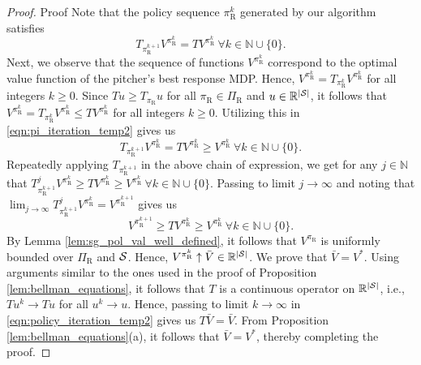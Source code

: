 \documentclass[opre,dblanonrev]{informs4}
\newcommand{\abs}[1]{\left\lvert#1\right\rvert}
\begin{document}
\begin{APPENDICES}
\begin{proof}{Proof}
           Note that the policy sequence $\pi_\text{R}^k$ generated by our algorithm satisfies  
           \begingroup
           \allowdisplaybreaks
           \begin{equation}
           \label{eqn:pi_iteration_temp2}
           T_{\pi_\text{R}^{k+1}}V^{\pi_\text{R}^k} = TV^{\pi_\text{R}^k} \ \forall k \in \mathbb{N} \cup \{0\}.
           \end{equation}
           \endgroup
           Next, we observe that the sequence of functions $V^{\pi_\text{R}^k}$ correspond to the optimal value function of the pitcher's best response MDP. Hence, $V^{\pi_\text{R}^k} = T_{\pi_\text{R}^k} V^{\pi_\text{R}^k}$ for all integers $k \geq 0$. Since $Tu \geq T_{\pi_\text{R}}u$ for all $\pi_\text{R} \in \Pi_\text{R}$ and $u \in \mathbb{R}^{\abs{\cal S}}$, it follows that $V^{\pi_\text{R}^k} = T_{\pi_\text{R}^k} V^{\pi_\text{R}^k} \leq T V^{\pi_\text{R}^k}$ for all integers $k \geq 0$. Utilizing this in \eqref{eqn:pi_iteration_temp2} gives us
           \[
               T_{\pi_\text{R}^{k+1}}V^{\pi_\text{R}^k} = TV^{\pi_\text{R}^k} \geq V^{\pi_\text{R}^k} \ \forall k \in \mathbb{N} \cup \{0\}.
           \]
          Repeatedly applying $T_{\pi_\text{R}^{k+1}}$ in the above chain of expression, we get for any $j \in \mathbb{N}$ that $T_{\pi_\text{R}^{k+1}}^j V^{\pi_\text{R}^k} \geq TV^{\pi_\text{R}^k} \geq V^{\pi_\text{R}^k} \ \forall k \in \mathbb{N} \cup \{0\}$. Passing to limit $j \to \infty$ and noting that $\lim_{j \to \infty}T_{\pi_\text{R}^{k+1}}^j V^{\pi_\text{R}^k} = V^{\pi_\text{R}^{k+1}}$ gives us
           \begingroup
           \allowdisplaybreaks
           \begin{equation}
           \label{eqn:policy_iteration_temp2}
               V^{\pi_\text{R}^{k+1}} \geq TV^{\pi_\text{R}^k} \geq V^{\pi_\text{R}^k} \ \forall k \in \mathbb{N} \cup \{0\}.
           \end{equation}
           \endgroup
           By Lemma  \ref{lem:sg_pol_val_well_defined}, it follows that $V^{\pi_\text{R}}$ is uniformly bounded over $\Pi_\text{R}$ and ${\cal S}$. Hence, $V^{\pi_\text{R}^k} \uparrow \bar V \in \mathbb{R}^{\abs{\cal S}}$. We prove that $\bar V = V^*$. Using arguments similar to the ones used in the proof of Proposition  \ref{lem:bellman_equations}, it follows that $T$ is a  continuous operator on $\mathbb{R}^{\abs{\cal S}}$, i.e., $T u^k \to T u$ for all $u^k \to u$. Hence, passing to limit $k \to \infty$ in \eqref{eqn:policy_iteration_temp2} gives us $T \bar V = \bar V$. From Proposition  \ref{lem:bellman_equations}(a), it follows that $\bar V = V^*$, thereby completing the proof.\Halmos
       \end{proof}
    

\end{APPENDICES}
\end{document}
